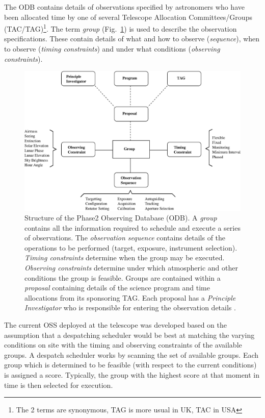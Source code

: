 
The ODB contains details of observations specified by astronomers who have been allocated time by one of several Telescope Allocation Committees/Groups (TAC/TAG)\footnote{The 2 terms are synonymous, TAG is more usual in UK, TAC in USA}.
The term \emph{group} (Fig.~\ref{fig:group}) is used to describe the observation specifications. These contain details of what and how to observe (\emph{sequence}), when to observe (\emph{timing constraints}) and under what conditions (\emph{observing constraints}). 

\begin{figure}[htbp]  
  \begin{center}
    \includegraphics[scale=0.6, angle=0]{figures/group_structure.eps}
  \end{center}
  \caption[Structure of the Phase2 Observing Database (ODB).]
   {Structure of the Phase2 Observing Database (ODB). A \emph{group} contains all the information required to schedule and execute a series of observations. The \emph{observation sequence} contains details of the operations to be performed (target, exposure, instrument selection). \emph{Timing constraints} determine when the group may be executed. \emph{Observing constraints} determine under which atmospheric and other conditions the group is feasible. Groups are contained within a \emph{proposal} containing details of the science program and time allocations from its sponsoring TAG. Each proposal has a \emph{Principle Investigator} who is responsible for entering the observation details  .}
  \label{fig:group}
\end{figure}

The current OSS deployed at the telescope \citep{fraser04scheduling} was developed based on the assumption that a despatching scheduler would be best at matching the varying conditions on site with the timing and observing constraints of the available groups. A despatch scheduler works by scanning the set of available groups. Each group which is determined to be feasible (with respect to the current conditions) is assigned a score. Typically, the group with the highest score at that moment in time is then selected for execution.


